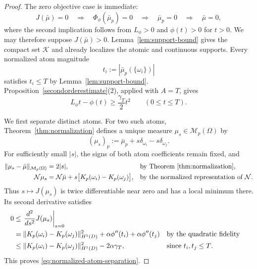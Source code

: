 \documentclass[11pt]{amsart}
\theoremstyle{definition}
\theoremstyle{remark}
\begin{document}
\begin{proof}
The zero objective case is immediate:
\begin{equation*}
	J(\bar\mu)=0
	\quad\Longrightarrow\quad
	\Phi_\phi(\bar\mu_p)=0
	\quad\Longrightarrow\quad
	\bar\mu_p=0
	\quad\Longrightarrow\quad
	\bar\mu=0,
\end{equation*}
where the second implication follows from $L_\phi>0$ and
$\phi(t)>0$ for $t>0$. We may therefore suppose $J(\bar\mu)>0$.
Lemma~\ref{lem:support-bound}
gives the compact set $\mathcal K$ and already localizes the atomic and
continuous supports.  Every normalized atom magnitude
\begin{equation*}
	t_i:=|\bar\mu_p(\{\omega_i\})|
\end{equation*}
satisfies $t_i\leq T$ by Lemma~\ref{lem:support-bound}. 
Proposition~\ref{secondorderestimate}(2), applied with $A=T$, gives
\begin{equation}
\label{eq:curvature-linear-gap}
	L_\phi t-\phi(t)\geq\frac{\gamma_T}{2}t^2
	\qquad(0\leq t\leq T).
\end{equation}

We first separate distinct atoms.  For two such atoms, Theorem~\ref{thm:normalization}
defines a unique measure $\mu_s\in\mathcal M_p(\Omega)$ by
\begin{equation*}
	(\mu_s)_p
	:=\bar\mu_p+s\delta_{\omega_i}-s\delta_{\omega_j}.
\end{equation*}
For sufficiently small $|s|$, the signs of both atom coefficients remain
fixed, and
\begin{align*}
	\|\mu_s-\bar\mu\|_{\mathcal M_p(\Omega)}
	&=2|s|,
	&&\text{by Theorem~\ref{thm:normalization}},\\
	\mathcal N\mu_s
	&=\mathcal N\bar\mu
	+s\bigl[K_p(\omega_i)-K_p(\omega_j)\bigr],
	&&\text{by the normalized representation of $\mathcal N$}.
\end{align*}
Thus $s\mapsto J(\mu_s)$ is twice differentiable near zero and has a local
minimum there.  Its second derivative satisfies
\begin{align*}
	0
	&\leq\left.\frac{d^2}{ds^2}J(\mu_s)\right|_{s=0}\\
	&=\|K_p(\omega_i)-K_p(\omega_j)\|_{H^1(D)}^2
	+\alpha\phi''(t_i)+\alpha\phi''(t_j)
	&&\text{by the quadratic fidelity}\notag\\
	&\leq\|K_p(\omega_i)-K_p(\omega_j)\|_{H^1(D)}^2
	-2\alpha\gamma_T,
	&&\text{since $t_i,t_j\leq T$}.
\end{align*}
This proves \eqref{eq:normalized-atom-separation}.


\end{proof}
\end{document}
